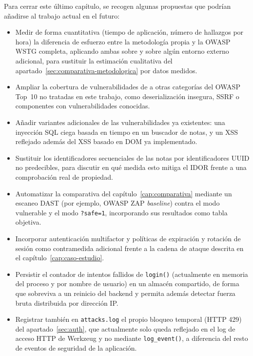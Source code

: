 Para cerrar este último capítulo, se recogen algunas
propuestas que podrían añadirse al trabajo actual en el futuro:

\begin{itemize}
\item Medir de forma cuantitativa (tiempo de aplicación, número de hallazgos
  por hora) la diferencia de esfuerzo entre la metodología propia y la
  OWASP WSTG completa, aplicando ambas sobre \breachlab y sobre algún
  entorno externo adicional, para sustituir la estimación cualitativa del
  apartado~\ref{sec:comparativa-metodologica} por datos medidos.
\item Ampliar la cobertura de vulnerabilidades de \breachlab a otras
  categorías del OWASP Top~10 no tratadas en este trabajo, como
  deserialización insegura, SSRF o componentes con vulnerabilidades
  conocidas.
\item Añadir variantes adicionales de las vulnerabilidades ya existentes:
  una inyección SQL ciega basada en tiempo en un buscador de notas, y un XSS
  reflejado además del XSS basado en DOM ya implementado.
\item Sustituir los identificadores secuenciales de las notas por
  identificadores UUID no predecibles, para discutir en qué medida esto
  mitiga el IDOR frente a una comprobación real de propiedad.
\item Automatizar la comparativa del capítulo~\ref{cap:comparativa} mediante
  un escaneo DAST (por ejemplo, OWASP ZAP \emph{baseline}) contra el modo
  vulnerable y el modo \texttt{?safe=1}, incorporando sus resultados como
  tabla objetiva.
\item Incorporar autenticación multifactor y políticas de expiración y
  rotación de sesión como contramedida adicional frente a la cadena de
  ataque descrita en el capítulo~\ref{cap:caso-estudio}.
\item Persistir el contador de intentos fallidos de \verb|login()|
  (actualmente en memoria del proceso y por nombre de usuario) en un
  almacén compartido, de forma que sobreviva a un reinicio del backend y
  permita además detectar fuerza bruta distribuida por dirección IP.
\item Registrar también en \texttt{attacks.log} el propio bloqueo temporal
  (HTTP 429) del apartado~\ref{sec:auth}, que actualmente solo queda
  reflejado en el log de acceso HTTP de Werkzeug y no mediante
  \verb|log_event()|, a diferencia del resto de eventos de seguridad de la
  aplicación.
\end{itemize}
